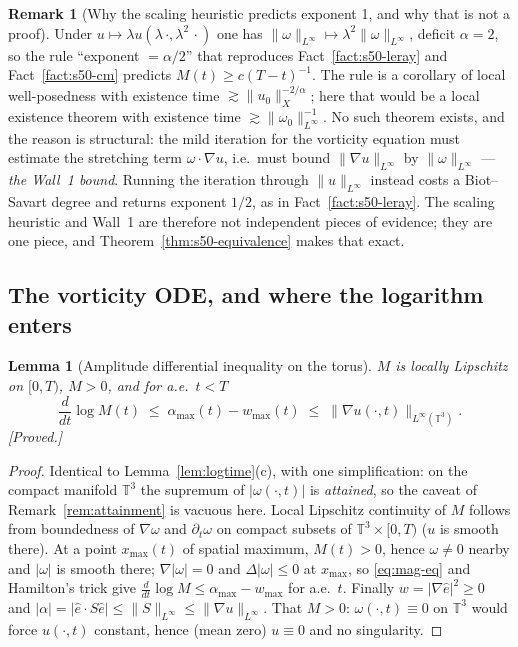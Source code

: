 \documentclass[11pt]{article}
\newtheorem{lemma}[theorem]{Lemma}
\theoremstyle{definition}
\newtheorem{remark}[theorem]{Remark}
\theoremstyle{remark}
\newcommand{\T}{\mathbb{T}}
\begin{document}
\begin{remark}[Why the scaling heuristic predicts exponent 1, and why that is
  not a proof]\label{rem:s50-scaling}
  Under $u\mapsto\lambda u(\lambda\,\cdot,\lambda^2\,\cdot)$ one has
  $\|\omega\|_{L^\infty}\mapsto\lambda^2\|\omega\|_{L^\infty}$, deficit
  $\alpha=2$, so the rule ``exponent $=\alpha/2$'' that reproduces
  Fact~\ref{fact:s50-leray} and Fact~\ref{fact:s50-cm} predicts
  $M(t)\geq c(T-t)^{-1}$. The rule is a corollary of local well-posedness with
  existence time $\gtrsim\|u_0\|_X^{-2/\alpha}$; here that would be a local
  existence theorem with existence time $\gtrsim\|\omega_0\|_{L^\infty}^{-1}$.
  No such theorem exists, and the reason is structural: the mild iteration for
  the vorticity equation must estimate the stretching term
  $\omega\cdot\nabla u$, i.e.\ must bound $\|\nabla u\|_{L^\infty}$ by
  $\|\omega\|_{L^\infty}$ --- \emph{the Wall~1 bound}. Running the iteration
  through $\|u\|_{L^\infty}$ instead costs a Biot--Savart degree and returns
  exponent $1/2$, as in Fact~\ref{fact:s50-leray}. The scaling heuristic and
  Wall~1 are therefore not independent pieces of evidence; they are one piece,
  and Theorem~\ref{thm:s50-equivalence} makes that exact.
\end{remark}

\subsection{The vorticity ODE, and where the logarithm enters}
\label{subsec:s50-ode}

\begin{lemma}[Amplitude differential inequality on the torus]
  \label{lem:s50-ode}
  $M$ is locally Lipschitz on $[0,T)$, $M>0$, and for a.e.\ $t<T$
  \begin{equation}\label{eq:s50-ode}
    \frac{d}{dt}\log M(t) \;\leq\; \alpha_{\max}(t) - w_{\max}(t)
      \;\leq\; \|\nabla u(\cdot,t)\|_{L^\infty(\T^3)} .
  \end{equation}
  \emph{[Proved.]}
\end{lemma}
\begin{proof}
  Identical to Lemma~\ref{lem:logtime}(c), with one simplification: on the
  compact manifold $\T^3$ the supremum of $|\omega(\cdot,t)|$ is
  \emph{attained}, so the caveat of Remark~\ref{rem:attainment} is vacuous
  here. Local Lipschitz continuity of $M$ follows from boundedness of
  $\nabla\omega$ and $\partial_t\omega$ on compact subsets of $\T^3\times[0,T)$
  ($u$ is smooth there). At a point $x_{\max}(t)$ of spatial maximum,
  $M(t)>0$, hence $\omega\neq0$ nearby and $|\omega|$ is smooth there;
  $\nabla|\omega|=0$ and $\Delta|\omega|\leq0$ at $x_{\max}$, so
  \eqref{eq:mag-eq} and Hamilton's trick give
  $\frac{d}{dt}\log M\leq\alpha_{\max}-w_{\max}$ for a.e.\ $t$. Finally
  $w=|\nabla\hat e|^2\geq0$ and
  $|\alpha|=|\hat e\cdot S\hat e|\leq\|S\|_{L^\infty}
  \leq\|\nabla u\|_{L^\infty}$. That $M>0$: $\omega(\cdot,t)\equiv0$ on $\T^3$
  would force $u(\cdot,t)$ constant, hence (mean zero) $u\equiv0$ and no
  singularity.
\end{proof}
\end{document}
